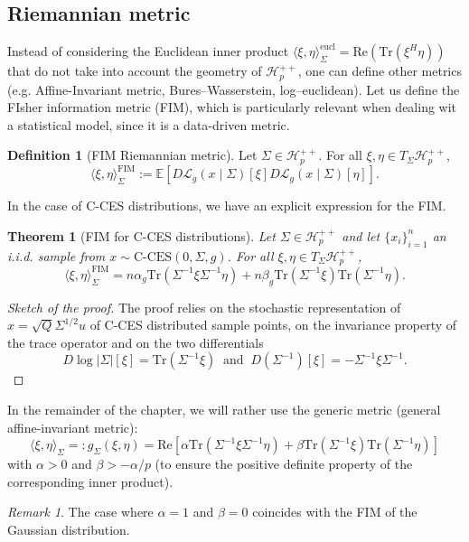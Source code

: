 \documentclass[10pt,a4paper]{book}
\theoremstyle{definition}
\newtheorem{defn}{Definition}[section]
\theoremstyle{plain}
\newtheorem{thm}{Theorem}[section]
\theoremstyle{remark}
\newtheorem{rmk}{Remark}[section]
\newcommand \Esp {\mathbb{E}}
\begin{document}
\subsection{Riemannian metric}
Instead of considering the Euclidean inner product $\langle \xi,\eta\rangle_{\Sigma}^{\text{eucl}}=\text{Re}(\text{Tr}(\xi^{H}\eta))$ that do not take into account the geometry of $\mathcal{H}_{p}^{++}$, one can define other metrics (e.g. Affine-Invariant metric, Bures--Wasserstein, log--euclidean). Let us define the FIsher information metric (FIM), which is particularly relevant when dealing wit a statistical model, since it is a data-driven metric.
\begin{defn}[FIM Riemannian metric]
Let $\Sigma\in \mathcal{H}_p^{++}$. For all $\xi, \eta \in T_{\Sigma}\mathcal{H}_{p}^{++}$, 
$$\langle \xi,\eta \rangle_{\Sigma}^{\text{FIM}}:=\Esp\left[ D\mathcal{L}_g(x\mid \Sigma)[\xi] D\mathcal{L}_g(x\mid \Sigma)[\eta] \right].$$
\end{defn}
In the case of C-CES distributions, we have an explicit expression for the FIM.
\begin{thm}[FIM for C-CES distributions]
Let $\Sigma\in \mathcal{H}_p^{++}$ and let $\{x_i\}_{i=1}^{n}$ an i.i.d. sample from $x\sim \text{C-CES}(0,\Sigma,g)$. For all $\xi, \eta \in T_{\Sigma}\mathcal{H}_{p}^{++}$, 
$$\langle \xi,\eta\rangle_{\Sigma}^{\text{FIM}}=n\alpha_g\text{Tr}(\Sigma^{-1}\xi\Sigma^{-1}\eta)+n\beta_g\text{Tr}(\Sigma^{-1}\xi)\text{Tr}(\Sigma^{-1}\eta).$$
\end{thm}
\begin{proof}[Sketch of the proof]
The proof relies on the stochastic representation of $x=\sqrt{Q}\Sigma^{1/2}u$ of C-CES  distributed sample points, on the invariance property of the trace operator and on the two differentials
$$D\log|\Sigma|[\xi]=\text{Tr}(\Sigma^{-1}\xi)~\text{ and }~D(\Sigma^{-1})[\xi]=-\Sigma^{-1}\xi\Sigma^{-1}.$$
\end{proof}
In the remainder of the chapter, we will rather use the generic metric (general affine-invariant metric):
\begin{equation} \label{eq.aimetric}
\langle \xi, \eta\rangle_{\Sigma}=:g_{\Sigma}(\xi,\eta)=\text{Re}\left[\alpha \text{Tr}(\Sigma^{-1}\xi\Sigma^{-1}\eta)+\beta \text{Tr}(\Sigma^{-1}\xi)\text{Tr}(\Sigma^{-1}\eta) \right]
\end{equation}
with $\alpha>0$ and $\beta>-\alpha/p$ (to ensure the positive definite property of the corresponding inner product).
\begin{rmk} The case where $\alpha=1$ and $\beta=0$ coincides with the FIM of the Gaussian distribution.
\end{rmk}
\end{document}
